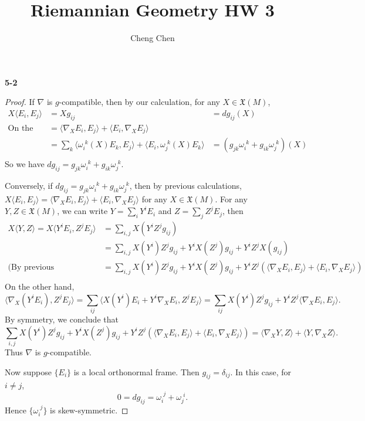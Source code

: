 \documentclass[11pt, a4paper]{article}
\title{Riemannian Geometry HW 3}
\author{Cheng Chen}
\date{}
\theoremstyle{plain}
\theoremstyle{definition}
\theoremstyle{remark}
\begin{document}
\maketitle

\newcommand{\nba}{\nabla}
\newcommand{\mtc}{metric-compatible}
\newcommand{\mt}[1]{\langle #1 \rangle}
\newcommand{\upd}[1]{^{\,\,#1}}
\newcommand{\omg}[2]{\omega_{#1}^{\,\,#2}}

\noindent\textbf{5-2}
\begin{proof}
    If $\nba$ is $g$-compatible, then by our calculation, for any $X \in \mathfrak{X}(M)$,
    \begin{align*}
        X\mt{E_i, E_j} &= Xg_{ij} &= dg_{ij}(X) \\
        \text{On the other hand } &= \mt{\nba_X E_i, E_j} + \mt{E_i, \nba_X E_j} \\
        &= \sum_k \mt{\omega_i\upd{k}(X) E_k, E_j} + \mt{E_i, \omega_j\upd{k}(X) E_k} &=  (g_{jk}\omg{i}{k} + g_{ik}\omg{j}{k})(X) \\
    \end{align*}
    So we have $dg_{ij} = g_{jk}\omg{i}{k} + g_{ik}\omg{j}{k}$.

    Conversely, if $dg_{ij} = g_{jk}\omg{i}{k} + g_{ik}\omg{j}{k}$, then by previous calculations, 
    $X\mt{E_i, E_j} = \mt{\nba_X E_i, E_j} + \mt{E_i, \nba_X E_j}$ for any $X \in \mathfrak{X}(M)$. 
    For any $Y, Z \in \mathfrak{X}(M)$, we can write $Y = \sum_i Y^i E_i$ and $Z = \sum_j Z^j E_j$, then
    \begin{align*}
        X\mt{Y,Z} = X\mt{Y^i E_i,Z^j E_j} &= \sum_{i,j} X(Y^i Z^j g_{ij}) \\
        &= \sum_{i,j} X(Y^i) Z^j g_{ij} + Y^i X(Z^j) g_{ij} + Y^i Z^j X(g_{ij}) \\
        \text{(By previous calculations)} &= \sum_{i,j} X(Y^i) Z^j g_{ij} + Y^i X(Z^j) g_{ij} + Y^iZ^j(\mt{\nba_X E_i, E_j} + \mt{E_i, \nba_X E_j}) \\
    \end{align*}
    On the other hand,
    \[ \mt{\nba_X (Y^i E_i),Z^j E_j} = \sum_{ij}\mt{X(Y^i)E_i + Y^i \nba_X E_i, Z^j E_j} = \sum_{ij} X(Y^i) Z^j g_{ij} + Y^iZ^j\mt{\nba_X E_i, E_j}.\]
    By symmetry, we conclude that 
    \[\sum_{i,j} X(Y^i) Z^j g_{ij} + Y^i X(Z^j) g_{ij} + Y^iZ^j(\mt{\nba_X E_i, E_j} + \mt{E_i, \nba_X E_j}) = \mt{\nba_X Y,Z} + \mt{Y, \nba_X Z}.\]
    Thus $\nba$ is $g$-compatible.

    Now suppose $\{E_i\}$ is a local orthonormal frame. Then $g_{ij} = \delta_{ij}$. In this case, for $i\neq j$,
    \[0 = dg_{ij} = \omg{i}{j} + \omg{j}{i}.\]
    Hence $\{\omg{i}{j}\}$ is skew-symmetric.
\end{proof}
\newpage
\newcommand{\p}{\partial}
\newcommand{\tx}{\widetilde{X}}
\newcommand{\ty}{\widetilde{Y}}
\newcommand{\tm}{\widetilde{M}}
\newcommand{\tz}{\widetilde{Z}}
\newcommand{\tba}{\widetilde{\nabla}}
\newcommand{\wt}{\widetilde}
\end{document}
